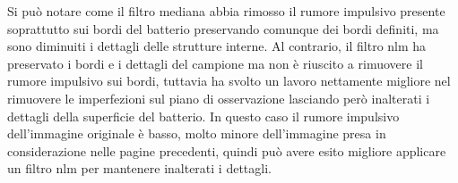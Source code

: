 \documentclass[../main.tex]{subfiles}
\begin{document}
Si può notare come il filtro mediana abbia rimosso il rumore impulsivo presente soprattutto sui bordi del batterio preservando comunque dei bordi definiti, ma sono diminuiti i dettagli delle strutture interne. Al contrario, il filtro \acrshort{nlm} ha preservato i bordi e i dettagli del campione ma non è riuscito a rimuovere il rumore impulsivo sui bordi, tuttavia ha svolto un lavoro nettamente migliore nel rimuovere le imperfezioni sul piano di osservazione lasciando però inalterati i dettagli della superficie del batterio. In questo caso il rumore impulsivo dell'immagine originale è basso, molto minore dell'immagine presa in considerazione nelle pagine precedenti, quindi può avere esito migliore applicare un filtro \acrshort{nlm} per mantenere inalterati i dettagli.
\end{document}
